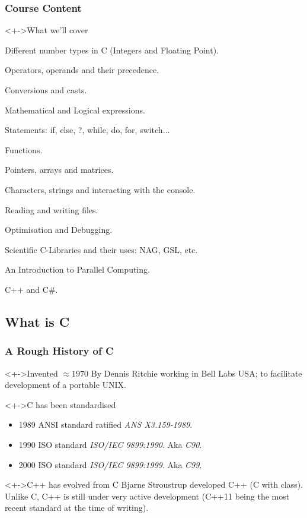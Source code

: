 \documentclass[smaller,handout,table]{beamer}
\begin{document}
\begin{frame}
\frametitle{Course Content}
\begin{block}<+->{What we'll cover}
\begin{itemize}
\begin{small}
\item Different number types in C (Integers and Floating Point).
\item Operators, operands and their precedence.
\item Conversions and casts.
\item Mathematical and Logical expressions.
\item Statements: if, else, ?, while, do, for, switch$\ldots$
\item Functions.
\item Pointers, arrays and matrices.
\item Characters, strings and interacting with the console.
\item Reading and writing files.
\item Optimisation and Debugging.
\item Scientific C-Libraries and their uses: NAG, GSL, etc.
\item An Introduction to Parallel Computing.
\item C++ and C\#.
\end{small}
\end{itemize}
\end{block}
\end{frame}

\subsection{What is C}
\begin{frame}
\frametitle{A Rough History of C}
\begin{block}<+->{Invented $\approx{1970}$}
By Dennis Ritchie working in Bell Labs USA; to facilitate development of
a portable UNIX.
\end{block}
\begin{block}<+->{C has been standardised}
\begin{itemize}
\item 1989 ANSI standard ratified \emph{ANS X3.159-1989}.
\item 1990 ISO standard \emph{ISO/IEC 9899:1990}. Aka \emph{C90}.
\item 2000 ISO standard \emph{ISO/IEC 9899:1999}. Aka \emph{C99}.
\end{itemize}
\end{block}
\begin{block}<+->{C++ has evolved from C}
Bjarne Stroustrup developed C++ (C with class). Unlike C, C++ is still under
very active development (C++11 being the most recent standard at the time of
writing).
\end{block}
\end{frame}
\end{document}
